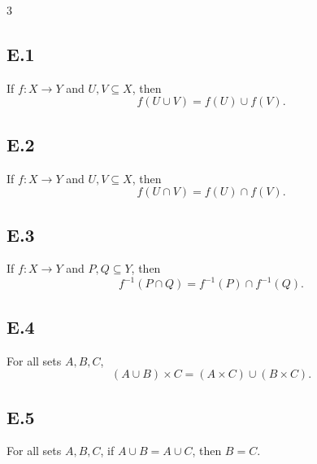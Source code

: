 \documentclass{article}
\begin{document}
\begin{multicols}{3}
\subsection*{E.1}
If $f:X\to Y$ and $U,V\subseteq X$, then
\[
f(U\cup V)=f(U)\cup f(V).
\]
\vspace{0.9in}

\subsection*{E.2}
If $f:X\to Y$ and $U,V\subseteq X$, then
\[
f(U\cap V)=f(U)\cap f(V).
\]
\vspace{0.9in}

\subsection*{E.3}
If $f:X\to Y$ and $P,Q\subseteq Y$, then
\[
f^{-1}(P\cap Q)=f^{-1}(P)\cap f^{-1}(Q).
\]
\vspace{0.9in}

\subsection*{E.4}
For all sets $A,B,C$,
\[
(A\cup B)\times C=(A\times C)\cup(B\times C).
\]
\vspace{0.9in}

\subsection*{E.5}
For all sets $A,B,C$, if $A\cup B=A\cup C$, then $B=C$.
\vspace{0.9in}
\end{multicols}
\end{document}
